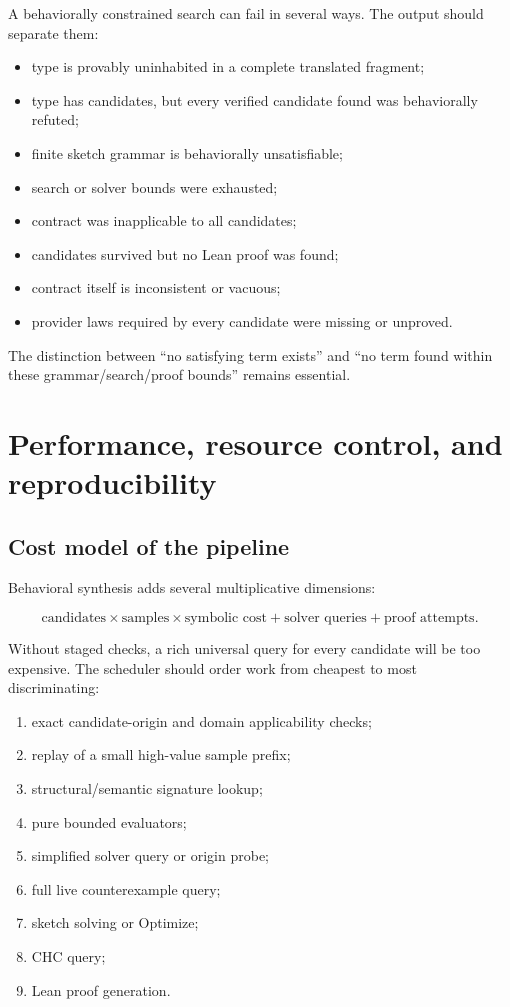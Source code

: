 \documentclass[11pt,oneside]{report}
\begin{document}
A behaviorally constrained search can fail in several ways. The output should separate them:

\begin{itemize}[leftmargin=2em]
\item type is provably uninhabited in a complete translated fragment;
\item type has candidates, but every verified candidate found was behaviorally refuted;
\item finite sketch grammar is behaviorally unsatisfiable;
\item search or solver bounds were exhausted;
\item contract was inapplicable to all candidates;
\item candidates survived but no Lean proof was found;
\item contract itself is inconsistent or vacuous;
\item provider laws required by every candidate were missing or unproved.
\end{itemize}

The distinction between ``no satisfying term exists'' and ``no term found within these grammar/search/proof bounds'' remains essential.

\chapter{Performance, resource control, and reproducibility}
\label{chap:performance}

\section{Cost model of the pipeline}

Behavioral synthesis adds several multiplicative dimensions:

\[
\text{candidates}\times\text{samples}\times\text{symbolic cost}
 + \text{solver queries}
 + \text{proof attempts}.
\]

Without staged checks, a rich universal query for every candidate will be too expensive. The scheduler should order work from cheapest to most discriminating:

\begin{enumerate}[leftmargin=2em]
\item exact candidate-origin and domain applicability checks;
\item replay of a small high-value sample prefix;
\item structural/semantic signature lookup;
\item pure bounded evaluators;
\item simplified solver query or origin probe;
\item full live counterexample query;
\item sketch solving or Optimize;
\item CHC query;
\item Lean proof generation.
\end{enumerate}
\end{document}
